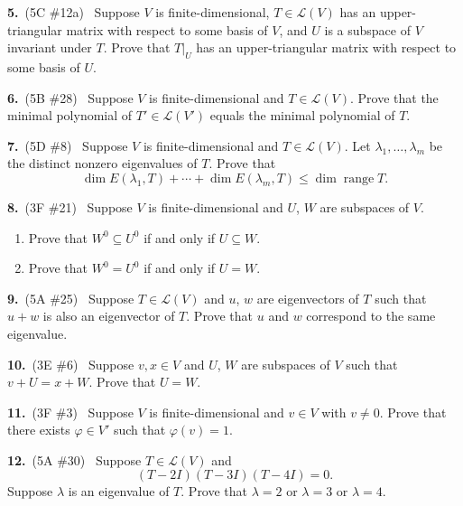 \documentclass[11pt]{article}
\DeclareMathOperator{\range}{range}
\newcommand{\LL}{\mathcal{L}}
\newcommand{\prob}[2]{\medskip\noindent\textbf{#1.}\ \textnormal{(#2)}\ }
\begin{document}
\prob{5}{5C \#12a} Suppose $V$ is finite-dimensional, $T\in\LL(V)$
has an upper-triangular matrix with respect to some basis of $V$, and
$U$ is a subspace of $V$ invariant under $T$. Prove that $T|_U$ has
an upper-triangular matrix with respect to some basis of $U$.

\prob{6}{5B \#28} Suppose $V$ is finite-dimensional and $T\in\LL(V)$.
Prove that the minimal polynomial of $T'\in\LL(V')$ equals the
minimal polynomial of $T$.

\prob{7}{5D \#8} Suppose $V$ is finite-dimensional and $T\in\LL(V)$.
Let $\lambda_1,\dots,\lambda_m$ be the distinct nonzero eigenvalues
of $T$. Prove that
\[\dim E(\lambda_1,T)+\cdots+\dim E(\lambda_m,T)\le\dim\range T.\]

\prob{8}{3F \#21} Suppose $V$ is finite-dimensional and $U$, $W$ are
subspaces of $V$.
\begin{enumerate}[label=(\alph*),topsep=2pt,itemsep=0pt]
  \item Prove that $W^0\subseteq U^0$ if and only if $U\subseteq W$.
  \item Prove that $W^0=U^0$ if and only if $U=W$.
\end{enumerate}

\prob{9}{5A \#25} Suppose $T\in\LL(V)$ and $u$, $w$ are eigenvectors
of $T$ such that $u+w$ is also an eigenvector of $T$. Prove that $u$
and $w$ correspond to the same eigenvalue.

\prob{10}{3E \#6} Suppose $v,x\in V$ and $U$, $W$ are subspaces of
$V$ such that $v+U=x+W$. Prove that $U=W$.

\prob{11}{3F \#3} Suppose $V$ is finite-dimensional and $v\in V$ with
$v\ne0$. Prove that there exists $\varphi\in V'$ such that $\varphi(v)=1$.

\prob{12}{5A \#30} Suppose $T\in\LL(V)$ and
\[(T-2I)(T-3I)(T-4I)=0.\]
Suppose $\lambda$ is an eigenvalue of $T$. Prove that $\lambda=2$ or
$\lambda=3$ or $\lambda=4$.
\end{document}
